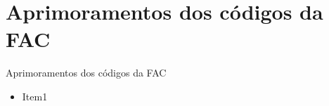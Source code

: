\section{Aprimoramentos dos códigos da FAC}


\begin{frame}{Aprimoramentos dos códigos da FAC}

{\footnotesize
\begin{itemize}
    \item Item1
\end{itemize}
}
\vspace{-0.2cm}
\end{frame}
